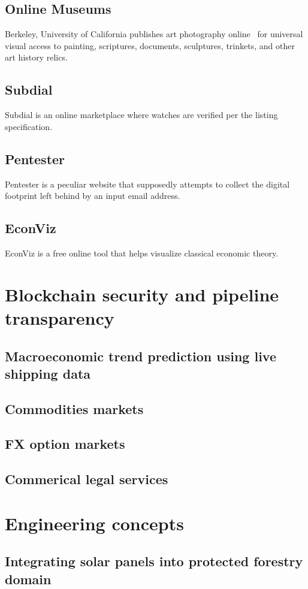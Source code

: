 \documentclass[11pt]{article}
\begin{document}
\subsection{Online Museums}
Berkeley, University of California publishes art photography online~\cite{a2024_library} for universal visual access to painting, scriptures, documents, sculptures, trinkets, and other art history relics.
\subsection{Subdial~\cite{a2023_subdial}}
Subdial is an online marketplace where watches are verified per the listing specification.
\subsection{Pentester~\cite{a2024_pentester}}
Pentester is a peculiar website that supposedly attempts to collect the digital footprint left behind by an input email address.
\subsection{EconViz~\cite{econvizorgmacroeconomicvisualizations_2025_econvizorg}}
EconViz is a free online tool that helps visualize classical economic theory.

\section{Blockchain security and pipeline transparency}
\subsection{Macroeconomic trend prediction using live shipping data}
\subsection{Commodities markets}
\subsection{FX option markets}
\subsection{Commerical legal services}

\section{Engineering concepts}
\subsection{Integrating solar panels into protected forestry domain}

\newpage
\printbibliography
{}
\end{document}
